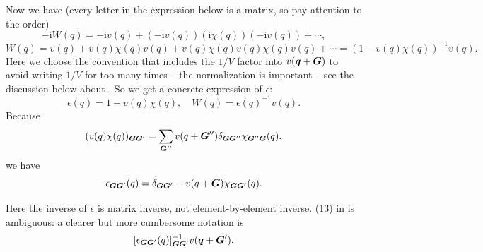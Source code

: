 \documentclass[hyperref, a4paper, 12pt]{report}
\newcommand*{\ii}{\mathrm{i}}
\begin{document}
Now we have (every letter in the expression below is a matrix,
so pay attention to the order)
\[
    - \ii W(q) = - \ii v(q) + (- \ii v(q)) (\ii \chi(q)) (- \ii v(q)) + \cdots ,
\]
\[
    W(q) = v(q) + v(q) \chi(q) v(q) + v(q) \chi(q) v(q) \chi(q) v(q) + \cdots
    = (1 - v(q) \chi(q))^{-1} v(q) .
\]
Here we choose the convention that includes the $1/V$ factor into $v(\vb*{q} + \vb*{G})$
to avoid writing $1/V$ for too many times -- 
the normalization is important -- see the discussion below about \cite{berkeleygw}. 
So we get a concrete expression of $\epsilon$: 
\begin{equation}
    \epsilon(q) = 1 - v(q) \chi(q), \quad W(q) = \epsilon(q)^{-1} v(q). 
\end{equation}
Because 
\[
    (v(q) \chi(q))_{\vb*{G} \vb*{G}'} 
    = \sum_{\vb{G}''} v(q + \vb*{G}'') \delta_{\vb*{G} \vb*{G}''} \chi_{\vb*{G}'' \vb*{G}}(q).
\]
we have
\begin{equation}
    \epsilon_{\vb*{G} \vb*{G}'}(q) 
    = \delta_{\vb*{G} \vb*{G}'} - v(q + \vb*{G}) \chi_{\vb*{G} \vb*{G}'}(q).
\end{equation}

Here the inverse of $\epsilon$ is matrix inverse, not element-by-element inverse.
(13) in \cite{berkeleygw} is ambiguous:
a clearer but more cumbersome notation is 
\[
    [\epsilon_{\vb*{G} \vb*{G}'}(q)]_{\vb*{G} \vb*{G}'}^{-1} v(\vb*{q} + \vb*{G}').
\]
\end{document}
